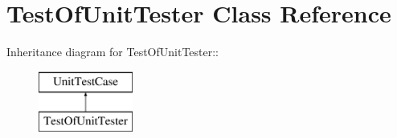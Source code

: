 \hypertarget{class_test_of_unit_tester}{
\section{TestOfUnitTester Class Reference}
\label{class_test_of_unit_tester}
}
Inheritance diagram for TestOfUnitTester::\begin{figure}[H]
\begin{center}
\leavevmode
\includegraphics[height=2cm]{class_test_of_unit_tester}
\end{center}
\end{figure}

